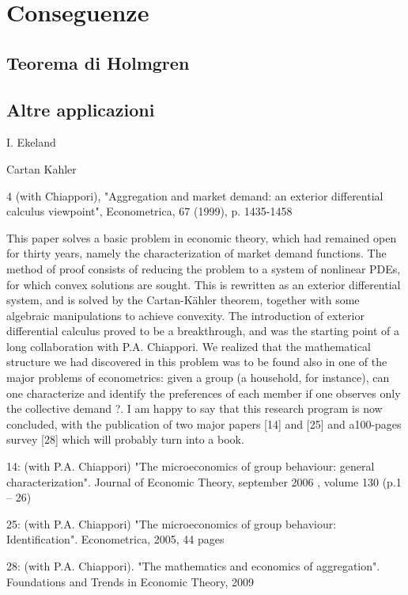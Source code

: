 \chapter{Conseguenze}
\section{Teorema di Holmgren}

\section{Altre applicazioni}
I. Ekeland

Cartan Kahler

4 (with Chiappori), "Aggregation and market demand: an exterior differential calculus viewpoint", Econometrica, 67 (1999), p. 1435-1458

This paper solves a basic problem in economic theory, which had remained open for thirty years, namely the characterization of market demand functions. The method of proof consists of reducing the problem to a system of nonlinear PDEs, for which convex solutions are sought. This is rewritten as an exterior differential system, and is solved by the Cartan-Kähler theorem, together with some algebraic manipulations to achieve convexity. The introduction of exterior differential calculus proved to be a breakthrough, and was the starting point of a long collaboration with P.A. Chiappori. We realized that the mathematical structure we had discovered in this problem was to be found also in one of the major problems of econometrics: given a group (a household, for instance), can one characterize and identify the preferences of each member if one observes only the collective demand ?. I am happy to say that this research program is now concluded, with the publication of two major papers [14] and [25] and a100-pages survey [28] which will probably turn into a book.

14: (with P.A. Chiappori) "The microeconomics of group behaviour: general characterization". Journal of Economic Theory, september 2006 , volume 130 (p.1 – 26)

25: (with P.A. Chiappori) "The microeconomics of group behaviour: Identification". Econometrica, 2005, 44 pages

28: (with P.A. Chiappori). "The mathematics and economics of aggregation". Foundations and Trends in Economic Theory, 2009